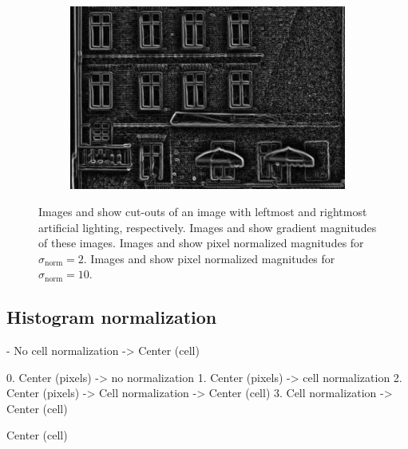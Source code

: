 \documentclass[thesis.tex]{subfiles}
\begin{document}
\begin{figure}[H]
\begin{subfigure}[t]{0.49\textwidth}
        \includegraphics[width=\textwidth]{img/pixelNormalizationExample8.png}
        \caption{}
        \label{fig:pixelNormalizationExample8}
    \end{subfigure}
    \caption{Images  and  show cut-outs of an image with leftmost and rightmost artificial lighting, respectively. Images  and  show gradient magnitudes of these images. Images  and  show pixel normalized magnitudes for $\sigma_\text{norm} = 2$. Images  and  show pixel normalized magnitudes for $\sigma_\text{norm} = 10$.}
    \label{fig:pixelNormalizationExample}
\end{figure}
%
\subsection{Histogram normalization}

- No cell normalization -> Center (cell)

0. Center (pixels) -> no normalization
1. Center (pixels) -> cell normalization
2. Center (pixels) -> Cell normalization -> Center (cell)
3. Cell normalization -> Center (cell)

Center (cell)


\subbibliography
\end{document}
